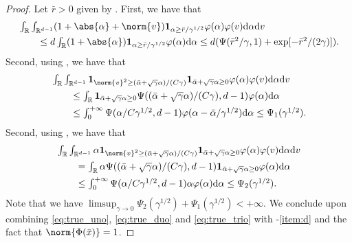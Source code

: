 \begin{proof}

	Let $\bar{r} > 0$ given by .
	First, we have that \begin{align}  & \textstyle\int_{\R} \int_{\R^{d-1}} (1 + \abs{\alpha} + \norm{v}) \bm{1}_{\alpha \geq \bar{r} /\gamma^{1/2}} \varphi(\alpha) \varphi(v) \mathrm{d} \alpha \mathrm{d} v \\  & \textstyle\qquad \leq d \int_{\R} (1 + \abs{\alpha}) \bm{1}_{\alpha \geq \bar{r} /\gamma^{1/2}} \varphi(\alpha) \mathrm{d} \alpha \leq d (\Psi(\bar{r}^2/\gamma,1) + \exp[-\bar{r}^2/(2\gamma)]) .
                 \label{eq:true_uno}
	\end{align}
	Second, using , we have that \begin{align}  & \textstyle\int_{\R} \int_{\R^{d-1}}\bm{1}_{\norm{v}^2\geq (\bar{\alpha}+\sqrt{\gamma}\alpha)/(C\gamma)} \bm{1}_{\bar{\alpha}+\sqrt{\gamma}\alpha \geq 0} \varphi(\alpha) \varphi(v) \mathrm{d} \alpha \mathrm{d} v \\ &\qquad \textstyle \leq \int_{\R} \bm{1}_{\bar{\alpha}+\sqrt{\gamma}\alpha \geq 0} \Psi((\bar{\alpha}+\sqrt{\gamma}\alpha)/(C\gamma), d-1) \varphi(\alpha) \mathrm{d} \alpha \\  & \qquad \textstyle \leq \int_{0}^{+\infty} \Psi(\alpha/C\gamma^{1/2}, d-1) \varphi(\alpha-\bar{\alpha}/\gamma^{1/2}) \mathrm{d} \alpha \leq \Psi_1(\gamma^{1/2}) .
                 \label{eq:true_duo}
	\end{align}
	Second, using , we have that \begin{align}  & \textstyle\int_{\R} \int_{\R^{d-1}}\alpha \bm{1}_{\norm{v}^2\geq (\bar{\alpha}+\sqrt{\gamma}\alpha)/(C\gamma)} \bm{1}_{\bar{\alpha}+\sqrt{\gamma}\alpha \geq 0} \varphi(\alpha) \varphi(v) \mathrm{d} \alpha \mathrm{d} v \\ &\qquad = \textstyle\int_{\R} \alpha \Psi((\bar{\alpha}+\sqrt{\gamma}\alpha)/(C\gamma),d-1) \bm{1}_{\bar{\alpha}+\sqrt{\gamma}\alpha \geq 0} \varphi(\alpha) \mathrm{d} \alpha \\  & \qquad \textstyle \leq \int_0^{+\infty} \Psi(\alpha/C\gamma^{1/2},d-1) \alpha \varphi(\alpha) \mathrm{d} \alpha \leq \Psi_2(\gamma^{1/2}).
                 \label{eq:true_trio}
	\end{align}
	Note that we have $\limsup_{\gamma \to 0} \Psi_2(\gamma^{1/2}) + \Psi_1(\gamma^{1/2}) < +\infty$.
	We conclude upon combining \eqref{eq:true_uno}, \eqref{eq:true_duo} and \eqref{eq:true_trio} with -\ref{item:d} and the fact that $\norm{\Phi(\bar{x})} =1$.
\end{proof}

